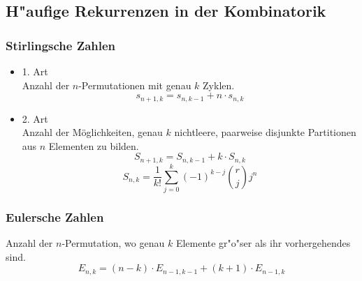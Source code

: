\subsection{H"aufige Rekurrenzen in der Kombinatorik}

%

\subsubsection{Stirlingsche Zahlen}

\begin{itemize}
\item 1. Art \\
Anzahl der \(n\)-Permutationen mit genau \(k\) Zyklen.
\[ s_{n+1,k} = s_{n,k-1} + n \cdot s_{n,k} \]

\item 2. Art \\
Anzahl der M\"oglichkeiten, genau $k$ nichtleere, paarweise disjunkte Partitionen aus \(n\) Elementen zu bilden.
\[ S_{n+1,k} = S_{n,k-1} + k \cdot S_{n,k} \]
\[ S_{n,k} = \frac{1}{k!} \sum^k_{j=0}(-1)^{k-j}{r \choose j}j^n \]
\end{itemize}

\subsubsection{Eulersche Zahlen}

Anzahl der \(n\)-Permutation, wo genau \(k\) Elemente gr"o"ser als ihr 
vorhergehendes sind.
\[ E_{n,k} = (n-k) \cdot E_{n-1,k-1} + (k+1) \cdot E_{n-1,k} \]


%


